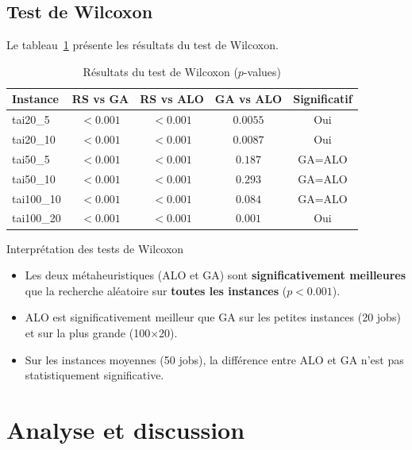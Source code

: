 \documentclass[12pt,a4paper,twoside]{report}
\begin{document}
\section{Test de Wilcoxon}

Le tableau~\ref{tab:wilcoxon} présente les résultats du test de Wilcoxon.

\begin{table}[H]
\centering
{}
\caption{Résultats du test de Wilcoxon ($p$-values)}
\label{tab:wilcoxon}
\begin{tabular}{lcccc}
\toprule
\rowcolor{TableHeader}
\color{white}Instance & \color{white}RS vs GA & \color{white}RS vs ALO & \color{white}GA vs ALO & \color{white}Significatif \\
\midrule
tai20\_5   & $< 0.001$ & $< 0.001$ & $0.0055$ & Oui \\
tai20\_10  & $< 0.001$ & $< 0.001$ & $0.0087$ & Oui \\
tai50\_5   & $< 0.001$ & $< 0.001$ & $0.187$  & GA=ALO \\
tai50\_10  & $< 0.001$ & $< 0.001$ & $0.293$  & GA=ALO \\
tai100\_10 & $< 0.001$ & $< 0.001$ & $0.084$  & GA=ALO \\
tai100\_20 & $< 0.001$ & $< 0.001$ & $0.001$  & Oui \\
\bottomrule
\end{tabular}
\end{table}

\begin{resultbox}{Interprétation des tests de Wilcoxon}
\begin{itemize}
    \item Les deux métaheuristiques (ALO et GA) sont \textbf{significativement meilleures} que la recherche aléatoire sur \textbf{toutes les instances} ($p < 0.001$).
    \item ALO est significativement meilleur que GA sur les petites instances (20 jobs) et sur la plus grande (100$\times$20).
    \item Sur les instances moyennes (50 jobs), la différence entre ALO et GA n'est pas statistiquement significative.
\end{itemize}
\end{resultbox}

\chapter{Analyse et discussion}
\end{document}
